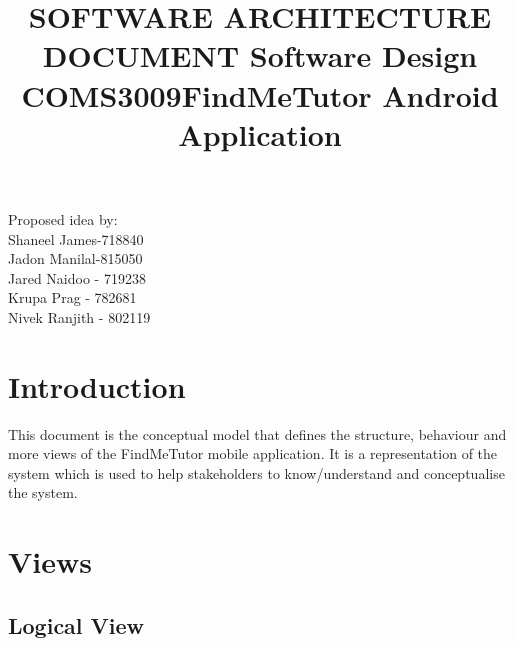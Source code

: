 \documentclass[12pt]{article}
\begin{document}
\title{\textbf{SOFTWARE ARCHITECTURE DOCUMENT }}
\maketitle

\begin{center}
\title{\textbf{Software Design COMS3009}}
\maketitle 
\end{center}
\begin{center}
\title{\textbf{FindMeTutor Android Application}}
\maketitle 
\end{center}

\begin{center}
Proposed idea by:\\
Shaneel James-718840
\\Jadon Manilal-815050
\\Jared Naidoo - 719238
\\Krupa Prag - 782681
\\Nivek Ranjith - 802119
\end{center}


\newpage
\tableofcontents
\newpage


\section{\textbf{Introduction}}
This document is the conceptual model that defines the structure, behaviour and more views of the FindMeTutor mobile application. It is a representation of the system which is used to help stakeholders to know/understand and conceptualise the system.


\section{Views}
\subsection{Logical View}
\end{document}
